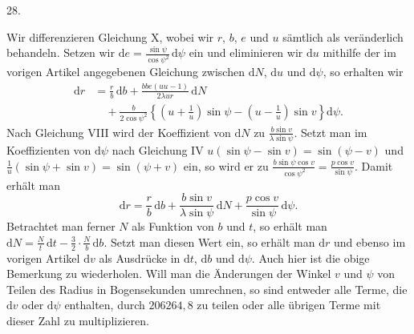 \par{}
\begin{center}
\hypertarget{native-044-article028}{}28.
\end{center}
Wir differenzieren Gleichung X, wobei wir $r$, $b$, $e$ und $u$ sämtlich als veränderlich behandeln. Setzen wir $\mathrm{d}e=\frac{\sin\psi}{\cos\psi^2}\,\mathrm{d}\psi$ ein und eliminieren wir $\mathrm{d}u$ mithilfe der im vorigen Artikel angegebenen Gleichung zwischen $\mathrm{d}N$, $\mathrm{d}u$ und $\mathrm{d}\psi$, so erhalten wir
\[
\begin{aligned}
\mathrm{d}r&=\frac{r}{b}\,\mathrm{d}b+\frac{bbe(uu-1)}{2\lambda ur}\,\mathrm{d}N\\
&\quad+\frac{b}{2\cos\psi^2}\left\{\left(u+\frac{1}{u}\right)\sin\psi-\left(u-\frac{1}{u}\right)\sin v\right\}\mathrm{d}\psi.
\end{aligned}
\]
Nach Gleichung VIII wird der Koeffizient von $\mathrm{d}N$ zu $\frac{b\sin v}{\lambda\sin\psi}$. Setzt man im Koeffizienten von $\mathrm{d}\psi$ nach Gleichung IV $u(\sin\psi-\sin v)=\sin(\psi-v)$ und $\frac{1}{u}(\sin\psi+\sin v)=\sin(\psi+v)$ ein, so wird er zu $\frac{b\sin\psi\cos v}{\cos\psi^2}=\frac{p\cos v}{\sin\psi}$. Damit erhält man
\[
\mathrm{d}r=\frac{r}{b}\,\mathrm{d}b+\frac{b\sin v}{\lambda\sin\psi}\,\mathrm{d}N+\frac{p\cos v}{\sin\psi}\,\mathrm{d}\psi.
\]
Betrachtet man ferner $N$ als Funktion von $b$ und $t$, so erhält man $\mathrm{d}N=\frac{N}{t}\,\mathrm{d}t-\frac{3}{2}\cdot\frac{N}{b}\,\mathrm{d}b$. Setzt man diesen Wert ein, so erhält man $\mathrm{d}r$ und ebenso im vorigen Artikel $\mathrm{d}v$ als Ausdrücke in $\mathrm{d}t$, $\mathrm{d}b$ und $\mathrm{d}\psi$. Auch hier ist die obige Bemerkung zu wiederholen. Will man die Änderungen der Winkel $v$ und $\psi$ von Teilen des Radius in Bogensekunden umrechnen, so sind entweder alle Terme, die $\mathrm{d}v$ oder $\mathrm{d}\psi$ enthalten, durch $206264{,}8$ zu teilen oder alle übrigen Terme mit dieser Zahl zu multiplizieren.
